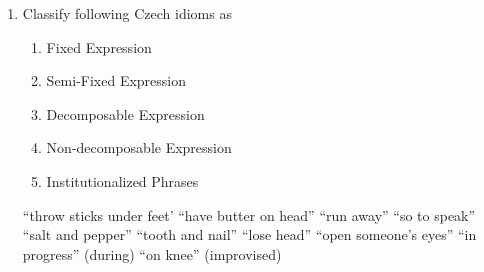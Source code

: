 \documentclass[a4paper]{article}
\begin{document}
\begin{enumerate}
\item Classify following Czech idioms as
  \begin{enumerate}
  \item Fixed Expression
  \item Semi-Fixed Expression
  \item Decomposable Expression
  \item Non-decomposable Expression
  \item Institutionalized Phrases
  \end{enumerate}
  \begin{exe}
    \ex {} ``throw sticks under feet' 
    \ex {} ``have butter on head'' 
    \ex {} ``run away''
    \ex {} ``so to speak''
    \ex {} ``salt and pepper''
    \ex {} ``tooth and nail''
    \ex {} ``lose head''
    \ex {} ``open someone's eyes''
    \ex {} ``in progress'' (during)
    \ex {} ``on knee'' (improvised)
  \end{exe}
\end{enumerate}

  
\end{document}
